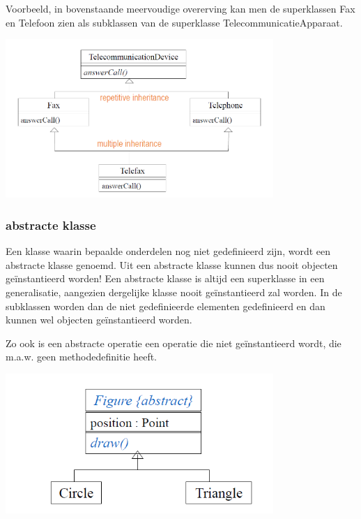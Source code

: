 Voorbeeld, in bovenstaande meervoudige overerving kan men de superklassen Fax en Telefoon zien als subklassen van de superklasse TelecommunicatieApparaat.


\begin{center}
\includegraphics[width=4in]{img/con2}%
\end{center}
\newpage
\subsubsection{abstracte klasse}

Een klasse waarin bepaalde onderdelen nog niet gedefinieerd zijn, wordt een abstracte klasse genoemd. Uit een abstracte klasse kunnen dus nooit objecten geïnstantieerd worden!
Een abstracte klasse is altijd een superklasse in een generalisatie, aangezien dergelijke klasse nooit geïnstantieerd zal worden. In de subklassen worden dan de niet gedefinieerde elementen gedefinieerd en dan kunnen wel objecten geïnstantieerd worden.

Zo ook is een abstracte operatie een operatie die niet geïnstantieerd wordt, die m.a.w. geen methodedefinitie heeft.


\begin{center}
\includegraphics[width=4in]{img/abs1}%
\end{center}

